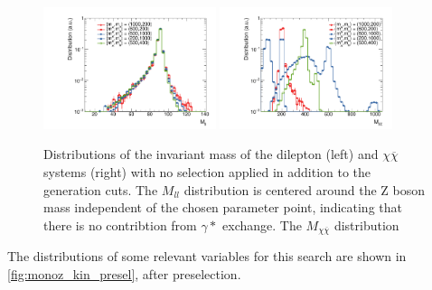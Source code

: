 \begin{figure}
\centering
\includegraphics[width=0.45\textwidth]{texinputs/04_grid/figures/monoz/leptonic/inclusive_h_mz_lep.pdf}
\includegraphics[width=0.45\textwidth]{texinputs/04_grid/figures/monoz/leptonic/inclusive_h_m_med_dm.pdf}
\caption{Distributions of the invariant mass of the dilepton (left) and $\chi\overline{\chi}$ systems (right) with no selection applied in addition to the generation cuts. The $M_{ll}$ distribution is centered around the Z boson mass independent of the chosen parameter point, indicating that there is no contribtion from $\gamma*$ exchange. The $M_{\chi\overline{\chi}}$ distribution }
\label{fig:monoz_kin_inclusive}
\end{figure}

The distributions of some relevant variables for this search are shown in \autoref{fig:monoz_kin_presel}, after preselection. 

